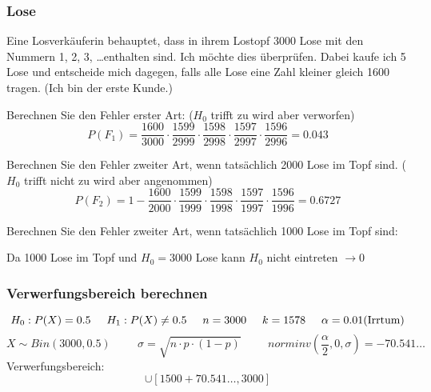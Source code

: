 \documentclass[landscape,twocolumn,a4paper]{article}
\begin{document}
\subsubsection*{Lose}
Eine Losverkäuferin behauptet, dass in ihrem Lostopf 3000 Lose mit den Nummern 1, 2, 3, \dots enthalten sind. Ich möchte dies überprüfen. Dabei kaufe ich 5 Lose und entscheide mich dagegen, falls alle Lose eine Zahl kleiner gleich 1600 tragen. (Ich bin der erste Kunde.) 

Berechnen Sie den Fehler erster Art: ($H_0$ trifft zu wird aber verworfen)
\begin{equation*}
	P(F_1) = \frac{1600}{3000} \cdot \frac{1599}{2999} \cdot \frac{1598}{2998} \cdot \frac{1597}{2997} \cdot \frac{1596}{2996}=0.043
\end{equation*}

Berechnen Sie den Fehler zweiter Art, wenn tatsächlich 2000 Lose im Topf sind. ($H_0$ trifft nicht zu wird aber angenommen)
\begin{equation*}
	P(F_2) = 1- \frac{1600}{2000} \cdot \frac{1599}{1999} \cdot \frac{1598}{1998} \cdot \frac{1597}{1997} \cdot \frac{1596}{1996}=0.6727
\end{equation*}

Berechnen Sie den Fehler zweiter Art, wenn tatsächlich 1000 Lose im Topf sind: 

Da 1000 Lose im Topf und $H_0=3000$ Lose kann $H_0$ nicht eintreten $\rightarrow 0$

\subsubsection*{Verwerfungsbereich berechnen}
\begin{equation*}
	H_0: P(X)=0.5 \hspace{0.5cm} H_1: P(X) \neq 0.5 \hspace{0.5cm} n=3000 \hspace{0.5cm} k=1578 \hspace{0.5cm} \alpha = 0.01 \text{(Irrtum)}
\end{equation*}
\begin{equation*}
	X \sim Bin(3000,0.5) \hspace{1cm} \sigma = \sqrt{n \cdot p \cdot (1 -p)} \hspace{1cm} norminv(\frac{\alpha}{2}, 0, \sigma)=-70.541 \dots
\end{equation*}
Verwerfungsbereich:
\begin{equation*}
	[0, 1500-70,541 \dots,] \cup [1500 + 70.541 \dots, 3000]
\end{equation*}
\end{document}
